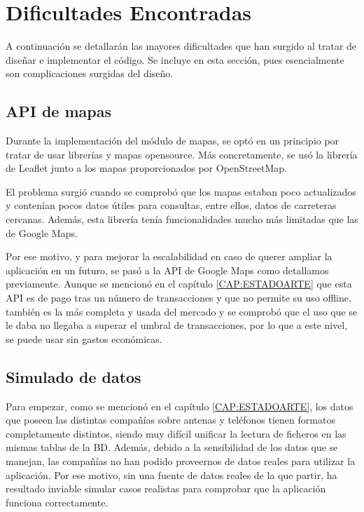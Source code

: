 \section{Dificultades Encontradas\label{SEC:DIFICULTAD}}
  A continuación se detallarán las mayores dificultades que han surgido al tratar de diseñar e implementar el código. Se incluye en esta sección, pues esencialmente son complicaciones surgidas del diseño.
  
  \subsection{API de mapas}
    Durante la implementación del módulo de mapas, se optó en un principio por tratar de usar librerías y mapas opensource. Más concretamente, se usó la librería de Leaflet junto a los mapas proporcionados por OpenStreetMap.
    
    El problema surgió cuando se comprobó que los mapas estaban poco actualizados y contenían pocos datos útiles para consultas, entre ellos, datos de carreteras cercanas. Además, esta librería tenía funcionalidades mucho más limitadas que las de Google Maps.
    
    Por ese motivo, y para mejorar la escalabilidad en caso de querer ampliar la aplicación en un futuro, se pasó a la API de Google Maps como detallamos previamente. 
    Aunque se mencionó en el capítulo \ref{CAP:ESTADOARTE} que esta API es de pago tras un número de transacciones y que no permite su uso offline, también es la más completa y usada del mercado y se comprobó que el uso que se le daba no llegaba a superar el umbral de transacciones, por lo que a este nivel, se puede usar sin gastos económicas.
    
    
   \subsection{Simulado de datos}
    Para empezar, como se mencionó en el capítulo \ref{CAP:ESTADOARTE}, los datos que poseen las distintas compañías sobre antenas y teléfonos tienen formatos completamente distintos, siendo muy difícil unificar la lectura de ficheros en las mismas tablas de la BD.
    Además, debido a la sensibilidad de los datos que se manejan, las compañías no han podido proveernos de datos reales para utilizar la aplicación. 
    Por ese motivo, sin una fuente de datos reales de la que partir, ha resultado inviable simular casos realistas para comprobar que la aplicación funciona correctamente. 
    
